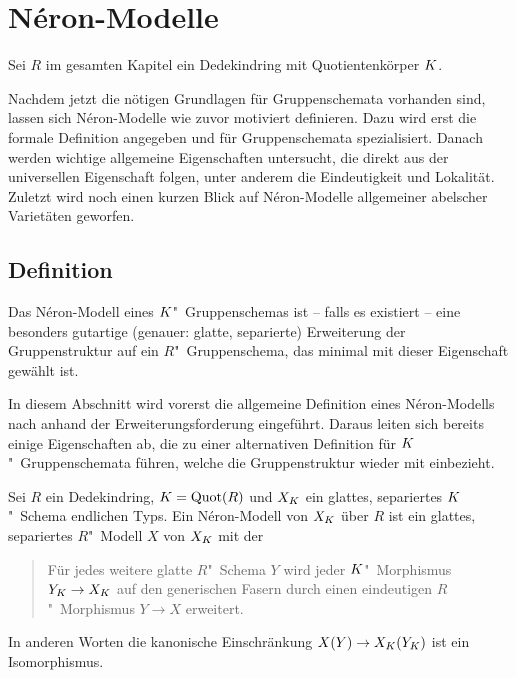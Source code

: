 \chapter{Néron-Modelle}\label{chap:neronmodelle}
Sei $R$ im gesamten Kapitel ein Dedekindring mit Quotientenkörper
$K$.

Nachdem jetzt die nötigen Grundlagen für Gruppenschemata vorhanden
sind, lassen sich Néron-Modelle wie zuvor motiviert definieren.
Dazu wird erst die formale Definition angegeben und für
Gruppenschemata spezialisiert. Danach werden wichtige allgemeine
Eigenschaften untersucht, die direkt aus der universellen Eigenschaft
folgen, unter anderem die Eindeutigkeit und Lokalität.
Zuletzt wird noch einen kurzen Blick auf Néron-Modelle
allgemeiner abelscher Varietäten geworfen.

\section{Definition}
Das Néron-Modell eines $K$"~Gruppenschemas ist – falls es existiert –
eine besonders gutartige (genauer: glatte, separierte) Erweiterung der
Gruppenstruktur auf ein $R$"~Gruppenschema, das
minimal mit dieser Eigenschaft gewählt ist.

In diesem Abschnitt wird vorerst die allgemeine Definition eines
Néron-Modells nach \cite[Definition~1.2/1]{neron} anhand der
Erweiterungsforderung eingeführt. Daraus leiten sich bereits einige
Eigenschaften ab, die zu einer alternativen Definition für
$K$"~Gruppenschemata führen, welche die Gruppenstruktur wieder mit
einbezieht.

\begin{Definition}
  Sei $R$ ein Dedekindring, $K=\operatorname{Quot}(R)$ und
  $X_{K}$ ein glattes, separiertes $K$"~Schema endlichen Typs.
  Ein Néron-Modell von $X_{K}$ über $R$ ist ein glattes, separiertes
  $R$"~Modell $X$ von $X_{K}$ mit der \NAbbEig
  \begin{quote}
    Für jedes weitere glatte $R$"~Schema $Y$ wird jeder
    $K$"~Morphismus $Y_{K}\to X_{K}$ auf den generischen Fasern durch
    einen eindeutigen $R$"~Morphismus $Y\to X$ erweitert.
  \end{quote}
  In anderen Worten die kanonische Einschränkung $X(Y)\to
  X_{K}(Y_{K})$ ist ein Isomorphismus.
\end{Definition}

